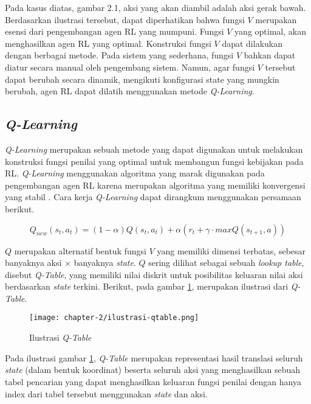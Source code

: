 Pada kasus diatas, gambar 2.1, aksi yang akan diambil adalah aksi gerak bawah. Berdasarkan ilustrasi tersebut, dapat diperhatikan bahwa fungsi \(V\) merupakan esensi dari pengembangan agen \ac{RL} yang mumpuni. Fungsi \(V\) yang optimal, akan menghasilkan agen \ac{RL} yang optimal. Konstruksi fungsi \(V\) dapat dilakukan dengan berbagai metode. Pada sistem yang sederhana, fungsi \(V\) bahkan dapat diatur secara manual oleh pengembang sistem. Namun, agar fungsi \(V\) tersebut dapat berubah secara dinamik, mengikuti konfigurasi state yang mungkin berubah, agen \ac{RL} dapat dilatih menggunakan metode \textit{Q-Learning}.

\subsection{\textit{Q-Learning}}
\textit{Q-Learning} merupakan sebuah metode yang dapat digunakan untuk melakukan konstruksi fungsi penilai yang optimal untuk membangun fungsi kebijakan pada \ac{RL}. \textit{Q-Learning} menggunakan algoritma yang marak digunakan pada pengembangan agen \ac{RL} karena merupakan algoritma yang memiliki konvergensi yang stabil \parencite{lim2022regularized}. Cara kerja \textit{Q-Learning} dapat dirangkum menggunakan persamaan berikut.

\begin{equation}
	\label{eq:q-learning}
	Q_{new}(s_t,a_t) = (1-\alpha) Q(s_t, a_t) + \alpha (r_t + \gamma \cdot maxQ(s_{t+1},a))
\end{equation}

\(Q\) merupakan alternatif bentuk fungsi \(V\) yang memiliki dimensi terbatas, sebesar banyaknya aksi \(\times\) banyaknya \textit{state}. \(Q\) sering dilihat sebagai sebuah \textit{lookup table}, disebut \textit{Q-Table}, yang memiliki nilai diskrit untuk posibilitas keluaran nilai aksi berdasarkan \textit{state} terkini. Berikut, pada gambar \ref{fig:ilustrasi-qtable}, merupakan ilustrasi dari \textit{Q-Table}.

\begin{figure}[h]
	\centering
	\texttt{[image: chapter-2/ilustrasi-qtable.png]}
	\caption{Ilustrasi \textit{Q-Table}}
	\label{fig:ilustrasi-qtable}
\end{figure}

Pada ilustrasi gambar \ref{fig:ilustrasi-qtable}, \textit{Q-Table} merupakan representasi hasil translasi seluruh \textit{state} (dalam bentuk koordinat) beserta seluruh aksi yang menghasilkan sebuah tabel pencarian yang dapat menghasilkan keluaran fungsi penilai dengan hanya index dari tabel tersebut menggunakan \textit{state} dan aksi.

